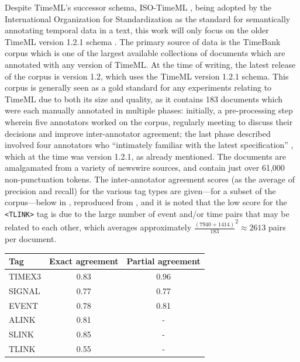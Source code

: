 \documentclass[a4paper,12pt,leqno,twoside]{article}
\begin{document}
Despite TimeML's successor schema, ISO-TimeML \citep{pustejovsky2010iso}, being adopted by the International Organization for Standardization as the standard \citep{ISO24617-1} for semantically annotating temporal data in a text, this work will only focus on the older TimeML version 1.2.1 schema \citep{timeml2005timeml,sauri2006timeml}. The primary source of data is the TimeBank corpus \citep{pustejovsky2006timebank} which is one of the largest available collections of documents which are annotated with any version of TimeML. At the time of writing, the latest release of the corpus is version 1.2, which uses the TimeML version 1.2.1 schema. This corpus is generally seen as a gold standard for any experiments relating to TimeML due to both its size and quality, as it contains 183 documents which were each manually annotated in multiple phases: initially, a pre-processing step wherein five annotators worked on the corpus, regularly meeting to discuss their decisions and improve inter-annotator agreement; the last phase described involved four annotators who ``intimately familiar with the latest specification'' \citep{timeml2005timeml}, which at the time was version 1.2.1, as already mentioned. The documents are amalgamated from a variety of newswire sources, and contain just over 61,000 non-punctuation tokens. The inter-annotator agreement scores (as the average of precision and recall) for the various tag types are given---for a subset of the corpus---below in , reproduced from \citet{timeml2005timeml}, and it is noted that the low score for the \verb|<TLINK>| tag is due to the large number of event and/or time pairs that may be related to each other, which averages approximately $\frac{(7940+1414)}{183}^2 \approx 2613$ pairs per document.
\begin{center}
	\begin{tabular}[]{|l c c|}
		\hline
		\textbf{Tag} & \textbf{Exact agreement} & \textbf{Partial agreement}\\
		\hline
		TIMEX3 & 0.83 & 0.96\\
		SIGNAL & 0.77 & 0.77\\
		EVENT & 0.78 & 0.81\\
		ALINK & 0.81 & -\\
		SLINK & 0.85 & -\\
		TLINK & 0.55 & -\\
		\hline
	\end{tabular}
	\label{fig:inter-annotator-timebank}
\end{center}
\end{document}
